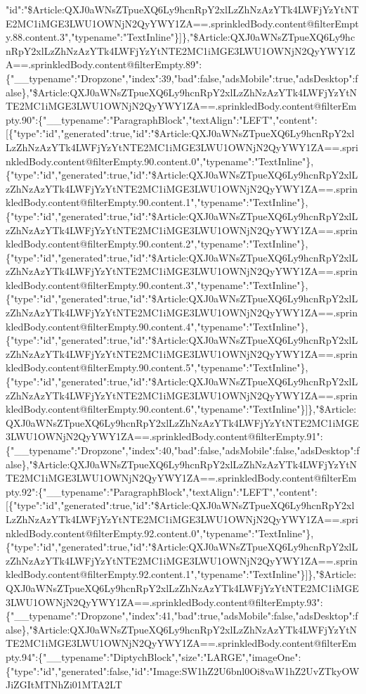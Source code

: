 "id":"\$Article:QXJ0aWNsZTpueXQ6Ly9hcnRpY2xlLzZhNzAzYTk4LWFjYzYtNTE2MC1iMGE3LWU1OWNjN2QyYWY1ZA==.sprinkledBody.content@filterEmpty.88.content.3","typename":"TextInline"\}{]}\},"\$Article:QXJ0aWNsZTpueXQ6Ly9hcnRpY2xlLzZhNzAzYTk4LWFjYzYtNTE2MC1iMGE3LWU1OWNjN2QyYWY1ZA==.sprinkledBody.content@filterEmpty.89":\{"\_\_typename":"Dropzone","index":39,"bad":false,"adsMobile":true,"adsDesktop":false\},"\$Article:QXJ0aWNsZTpueXQ6Ly9hcnRpY2xlLzZhNzAzYTk4LWFjYzYtNTE2MC1iMGE3LWU1OWNjN2QyYWY1ZA==.sprinkledBody.content@filterEmpty.90":\{"\_\_typename":"ParagraphBlock","textAlign":"LEFT","content":{[}\{"type":"id","generated":true,"id":"\$Article:QXJ0aWNsZTpueXQ6Ly9hcnRpY2xlLzZhNzAzYTk4LWFjYzYtNTE2MC1iMGE3LWU1OWNjN2QyYWY1ZA==.sprinkledBody.content@filterEmpty.90.content.0","typename":"TextInline"\},\{"type":"id","generated":true,"id":"\$Article:QXJ0aWNsZTpueXQ6Ly9hcnRpY2xlLzZhNzAzYTk4LWFjYzYtNTE2MC1iMGE3LWU1OWNjN2QyYWY1ZA==.sprinkledBody.content@filterEmpty.90.content.1","typename":"TextInline"\},\{"type":"id","generated":true,"id":"\$Article:QXJ0aWNsZTpueXQ6Ly9hcnRpY2xlLzZhNzAzYTk4LWFjYzYtNTE2MC1iMGE3LWU1OWNjN2QyYWY1ZA==.sprinkledBody.content@filterEmpty.90.content.2","typename":"TextInline"\},\{"type":"id","generated":true,"id":"\$Article:QXJ0aWNsZTpueXQ6Ly9hcnRpY2xlLzZhNzAzYTk4LWFjYzYtNTE2MC1iMGE3LWU1OWNjN2QyYWY1ZA==.sprinkledBody.content@filterEmpty.90.content.3","typename":"TextInline"\},\{"type":"id","generated":true,"id":"\$Article:QXJ0aWNsZTpueXQ6Ly9hcnRpY2xlLzZhNzAzYTk4LWFjYzYtNTE2MC1iMGE3LWU1OWNjN2QyYWY1ZA==.sprinkledBody.content@filterEmpty.90.content.4","typename":"TextInline"\},\{"type":"id","generated":true,"id":"\$Article:QXJ0aWNsZTpueXQ6Ly9hcnRpY2xlLzZhNzAzYTk4LWFjYzYtNTE2MC1iMGE3LWU1OWNjN2QyYWY1ZA==.sprinkledBody.content@filterEmpty.90.content.5","typename":"TextInline"\},\{"type":"id","generated":true,"id":"\$Article:QXJ0aWNsZTpueXQ6Ly9hcnRpY2xlLzZhNzAzYTk4LWFjYzYtNTE2MC1iMGE3LWU1OWNjN2QyYWY1ZA==.sprinkledBody.content@filterEmpty.90.content.6","typename":"TextInline"\}{]}\},"\$Article:QXJ0aWNsZTpueXQ6Ly9hcnRpY2xlLzZhNzAzYTk4LWFjYzYtNTE2MC1iMGE3LWU1OWNjN2QyYWY1ZA==.sprinkledBody.content@filterEmpty.91":\{"\_\_typename":"Dropzone","index":40,"bad":false,"adsMobile":false,"adsDesktop":false\},"\$Article:QXJ0aWNsZTpueXQ6Ly9hcnRpY2xlLzZhNzAzYTk4LWFjYzYtNTE2MC1iMGE3LWU1OWNjN2QyYWY1ZA==.sprinkledBody.content@filterEmpty.92":\{"\_\_typename":"ParagraphBlock","textAlign":"LEFT","content":{[}\{"type":"id","generated":true,"id":"\$Article:QXJ0aWNsZTpueXQ6Ly9hcnRpY2xlLzZhNzAzYTk4LWFjYzYtNTE2MC1iMGE3LWU1OWNjN2QyYWY1ZA==.sprinkledBody.content@filterEmpty.92.content.0","typename":"TextInline"\},\{"type":"id","generated":true,"id":"\$Article:QXJ0aWNsZTpueXQ6Ly9hcnRpY2xlLzZhNzAzYTk4LWFjYzYtNTE2MC1iMGE3LWU1OWNjN2QyYWY1ZA==.sprinkledBody.content@filterEmpty.92.content.1","typename":"TextInline"\}{]}\},"\$Article:QXJ0aWNsZTpueXQ6Ly9hcnRpY2xlLzZhNzAzYTk4LWFjYzYtNTE2MC1iMGE3LWU1OWNjN2QyYWY1ZA==.sprinkledBody.content@filterEmpty.93":\{"\_\_typename":"Dropzone","index":41,"bad":true,"adsMobile":false,"adsDesktop":false\},"\$Article:QXJ0aWNsZTpueXQ6Ly9hcnRpY2xlLzZhNzAzYTk4LWFjYzYtNTE2MC1iMGE3LWU1OWNjN2QyYWY1ZA==.sprinkledBody.content@filterEmpty.94":\{"\_\_typename":"DiptychBlock","size":"LARGE","imageOne":\{"type":"id","generated":false,"id":"Image:SW1hZ2U6bnl0Oi8vaW1hZ2UvZTkyOWJiZGItMTNhZi01MTA2LT
